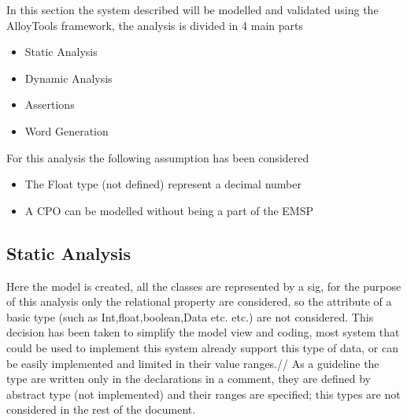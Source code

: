 In this section the system described will be modelled and validated using the AlloyTools framework, the analysis is divided in 4 main parts
\begin{itemize}
    \item Static Analysis
    \item Dynamic Analysis
    \item Assertions
    \item Word Generation
\end{itemize}
For this analysis the following assumption has been considered
\begin{itemize}
    \item The Float type (not defined) represent a decimal number
    \item A CPO can be modelled without being a part of the EMSP
\end{itemize}

\subsection{Static Analysis}
Here the model is created, all the classes are represented by a sig, for the purpose of this analysis only the relational property are considered, so the attribute of a basic type (such as Int,float,boolean,Data etc. etc.) are not considered.
This decision has been taken to simplify the model view and coding, most system that could be used to implement this system already support this type of data, or can be easily implemented and limited in their value ranges.//
As a guideline the type are written only in the declarations in a comment, they are defined by abstract type (not implemented) and their ranges are specified; this types are not considered in the rest of the document.

